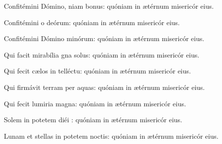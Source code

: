 \item Confitémini Dómino, niam bonus:\psstar{} quóniam in ætérnum misericór eius.

\item Confitémini o deórum:\psstar{} quóniam in ætérnum misericór eius.

\item Confitémini Dómino minórum:\psstar{} quóniam in ætérnum misericór eius.

\item Qui facit mirabília gna solus:\psstar{} quóniam in ætérnum misericór eius.

\item Qui fecit cælos in telléctu:\psstar{} quóniam in ætérnum misericór eius.

\item Qui firmávit terram per aquas:\psstar{} quóniam in ætérnum misericór eius.

\item Qui fecit lumiria magna:\psstar{} quóniam in ætérnum misericór eius.

\item Solem in potetem diéi :\psstar{} quóniam in ætérnum misericór eius.

\item Lunam et stellas in potetem noctis:\psstar{} quóniam in ætérnum misericór eius.
